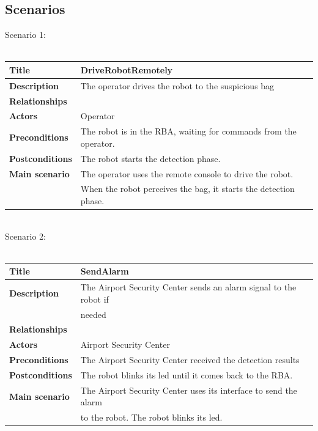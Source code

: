 \documentclass{llncs}
\newcommand{\labelssec}[1]{\label{ssec:#1}}
\begin{document}
\subsection{Scenarios}
\labelssec{Scenarios}
Scenario 1:\\ \\
\begin{tabular}{| l | l |}
	\hline
	\textbf{Title} & DriveRobotRemotely
	\\ \hline
	\textbf{Description}  & The operator drives the robot to the suspicious bag
	\\ \hline
	\textbf{Relationships} & 
	\\ \hline
	\textbf{Actors} & Operator
	\\ \hline
	\textbf{Preconditions} & The robot is in the RBA, waiting for commands from the operator.
	\\ \hline
	\textbf{Postconditions} & The robot starts the detection phase.
	\\ \hline
	\textbf{Main scenario} & The operator uses the remote console to drive the robot. \\ &
	When the robot perceives the bag, it starts the detection phase.
	\\ \hline
\end{tabular}
\\ Scenario 2:\\ \\
\begin{tabular}{| l | l |}
	\hline
	\textbf{Title} & SendAlarm
	\\ \hline
	\textbf{Description}  & The Airport Security Center sends an alarm signal to the robot if \\ & needed
	\\ \hline
	\textbf{Relationships} & 
	\\ \hline
	\textbf{Actors} & Airport Security Center
	\\ \hline
	\textbf{Preconditions} & The Airport Security Center received the detection results
	\\ \hline
	\textbf{Postconditions} & The robot blinks its led until it comes back to the RBA.
	\\ \hline
	\textbf{Main scenario} & 
	The Airport Security Center uses its interface to send the alarm \\ & to the robot.
	The robot blinks its led.
	\\ \hline
\end{tabular}

\newpage
\end{document}
